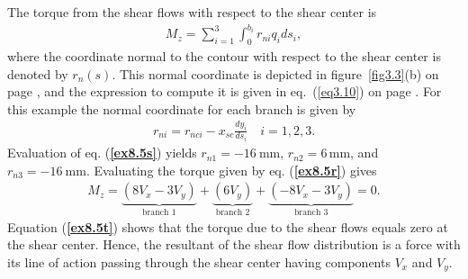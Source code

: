 \documentclass{AeroStructure-ERJohnson}
\begin{document}
\begin{example*}
The torque from the shear flows with respect to the shear center is
\begin{align}
M_{z}=\sum_{i=1}^{3} \int^{b_i}_{0}r_{ni}q_i d s_{i},\tag{r}\label{ex8.5r}
\end{align}
where the coordinate normal to the contour with respect to the
shear center is denoted by $r_{n}(s)$. This normal coordinate is
depicted in figure~\ref{fig3.3}(b) on page \pageref{fig3.3}, and the expression to
compute it is given in eq.~(\ref{eq3.10}) on page \pageref{eq3.10}. For this
example the normal coordinate for each branch is given by
\begin{align}
r_{n i}=r_{n c i}-x_{s c} \frac{d y_{i}}{d s_{i}} \quad
i=1,2,3.\tag{s}\label{ex8.5s}
\end{align}
Evaluation of eq. (\textbf{\ref{ex8.5s}}) yields $r_{n 1}=-16
\mathrm{~mm}$, $r_{n 2}=6\,\mathrm{mm}$, and $r_{n 3}=-16
\mathrm{~mm}$. Evaluating the torque given by eq. (\textbf{\ref{ex8.5r}})
gives
\begin{align}
M_{z}=\underbrace{\left(8 V_{x}-3 V_{y}\right)}_{\text
{branch } 1}+\underbrace{\left(6 V_{y}\right)}_{\text {branch }
2}+\underbrace{\left(-8 V_{x}-3 V_{y}\right)}_{\text {branch }
3}=0.\tag{t}\label{ex8.5t}
\end{align}
Equation (\textbf{\ref{ex8.5t}}) shows that the torque due to the
shear flows equals zero at the shear center. Hence, the resultant
of the shear flow distribution is a force with its line of action
passing through the shear center having components $V_{x}$ and
$V_{y}$.


\end{example*}
\end{document}
